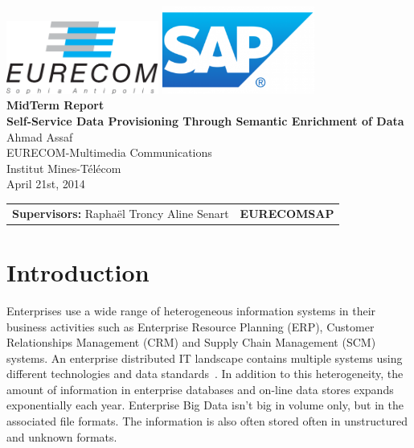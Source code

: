 \documentclass[onecolumn, crcready]{../../Util/LaTEX/iosart2c}
\begin{document}
\begin{center}
\includegraphics[width=5cm]{EURECOM_logo}\hspace{5cm}
\includegraphics[width=5cm]{SAP_logo}
\\[3cm]
\textbf{\Huge{MidTerm Report}}
\\[4cm]
\textbf{\LARGE{Self-Service Data Provisioning Through Semantic Enrichment of Data}}
\\[0.5cm]
\LARGE{Ahmad Assaf}
\\[0.5cm]
\small{EURECOM-Multimedia Communications}
\\
\large{Institut Mines-T\'{e}l\'{e}com}
\\
\large{April 21st, 2014}
\\[5cm]
\begin{tabular}{p{8cm} p{8.5cm}}
\small{\textbf{Supervisors:}\newline
Rapha\"el Troncy \newline Aline Senart}
&
\small{\textbf{\newline EURECOM\newline SAP}}
\end{tabular}
\end{center}


\section{Introduction}
\label{sec:introduction}

Enterprises use a wide range of heterogeneous information systems in their business activities such as Enterprise Resource Planning (ERP), Customer Relationships Management (CRM) and Supply Chain Management (SCM) systems. An enterprise distributed IT landscape contains multiple systems using different technologies and data standards~\cite{Mihindukulasooriya:COLD:13}. In addition to this heterogeneity, the amount of information in enterprise databases and on-line data stores expands exponentially each year. Enterprise Big Data isn't big in volume only, but in the associated file formats. The information is also often stored often in unstructured and unknown formats.
\end{document}
